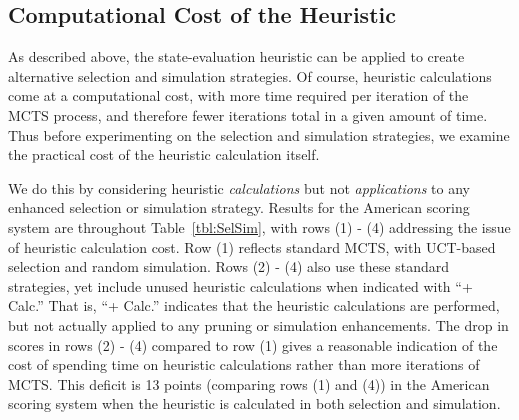 \documentclass[letterpaper]{article}
\begin{document}


\subsection{Computational Cost of the Heuristic}

As described above, the state-evaluation heuristic can be applied to create alternative selection and simulation strategies. Of course, heuristic calculations come at a computational cost, with more time required per iteration of the MCTS process, and therefore fewer iterations total in a given amount of time. Thus before experimenting on the selection and simulation strategies, we examine the practical cost of the heuristic calculation itself.

We do this by considering heuristic {\it calculations} but not {\it applications} to any enhanced selection or simulation strategy. Results for the American scoring system are throughout Table~\ref{tbl:SelSim}, with rows (1) - (4) addressing the issue of heuristic calculation cost. Row (1) reflects standard MCTS, with UCT-based selection and random simulation. Rows (2) - (4) also use these standard strategies, yet include unused heuristic calculations when indicated with ``+ Calc.'' That is, ``+ Calc.'' indicates that the heuristic calculations are performed, but not actually applied to any pruning or simulation enhancements. The drop in scores in rows (2) - (4) compared to row (1) gives a reasonable indication of the cost of spending time on heuristic calculations rather than more iterations of MCTS. This deficit is 13 points (comparing rows (1) and (4)) in the American scoring system when the heuristic is calculated in both selection and simulation.
\end{document}
